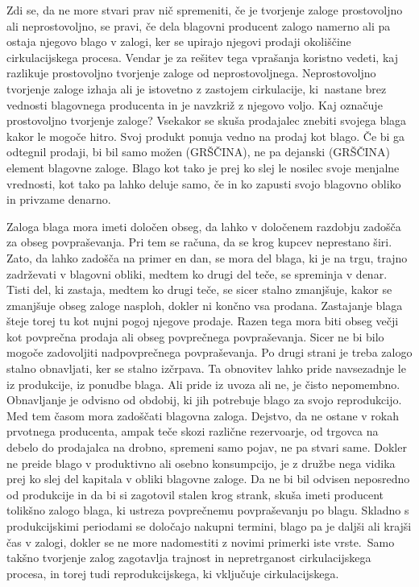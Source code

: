 \documentclass[kapital_02.tex]{subfiles}
\begin{document}
Zdi se, da ne more stvari prav nič spremeniti, če je tvorjenje zaloge prostovoljno ali neprostovoljno, se pravi, če dela blagovni producent zalogo namerno ali pa ostaja njegovo blago v zalogi, ker se upirajo njegovi prodaji okoliščine cirkulacijskega procesa.
Vendar je za rešitev tega vprašanja koristno vedeti, kaj razlikuje prostovoljno tvorjenje zaloge od neprostovoljnega. 
Neprostovoljno tvorjenje zaloge izhaja ali je istovetno z zastojem cirkulacije, ki\KPEstran\ nastane brez vednosti blagovnega producenta in je navzkriž z njegovo voljo.
Kaj označuje prostovoljno tvorjenje zaloge?
Vsekakor se skuša prodajalec znebiti svojega blaga kakor le mogoče hitro. 
Svoj produkt ponuja vedno na prodaj kot blago.
Če bi ga odtegnil prodaji, bi bil samo možen (GRŠČINA), ne pa dejanski (GRŠČINA) element blagovne zaloge. %
Blago kot tako je prej ko slej le nosilec svoje menjalne vrednosti, kot tako pa lahko deluje samo, če in ko zapusti svojo blagovno obliko in privzame denarno.

Zaloga blaga mora imeti določen obseg, da lahko v določenem razdobju zadošča za obseg povpraševanja.
Pri tem se računa, da se krog kupcev neprestano širi.
Zato, da lahko zadošča na primer en dan, se mora del blaga, ki je na trgu, trajno zadrževati v blagovni obliki, medtem ko drugi del teče, se spreminja v denar.
Tisti del, ki zastaja, medtem ko drugi teče, se sicer stalno zmanjšuje, kakor se zmanjšuje obseg zaloge nasploh, dokler ni končno vsa prodana.
Zastajanje blaga šteje torej tu kot nujni pogoj njegove prodaje.
Razen tega mora biti obseg večji kot povprečna prodaja ali obseg povprečnega povpraševanja.
Sicer ne bi bilo mogoče zadovoljiti nadpovprečnega povpraševanja.
Po drugi strani je treba zalogo stalno obnavljati, ker se stalno izčrpava.
Ta obnovitev lahko pride navsezadnje le iz produkcije, iz ponudbe blaga.
Ali pride iz uvoza ali ne, je čisto nepomembno.
Obnavljanje je odvisno od obdobij, ki jih potrebuje blago za svojo reprodukcijo.
Med tem časom mora zadoščati blagovna zaloga.
Dejstvo, da ne ostane v rokah prvotnega producenta, ampak teče skozi različne rezervoarje, od trgovca na debelo do prodajalca na drobno, spremeni samo pojav, ne pa stvari same. Dokler ne preide blago v produktivno ali osebno konsumpcijo, je z družbe nega vidika prej ko slej del kapitala v obliki blagovne zaloge.
Da ne bi bil odvisen neposredno od produkcije in da bi si zagotovil stalen krog strank, skuša imeti producent tolikšno zalogo blaga, ki ustreza povprečnemu povpraševanju po blagu. 
Skladno s produkcijskimi periodami se določajo nakupni termini, blago pa je daljši ali krajši čas v zalogi, dokler se ne more nadomestiti z novimi primerki %
iste vrste.\KPEstran\ Samo takšno tvorjenje zalog zagotavlja trajnost in nepretrganost cirkulacijskega procesa, in torej tudi reprodukcijskega, ki vključuje cirkulacijskega.
\end{document}
